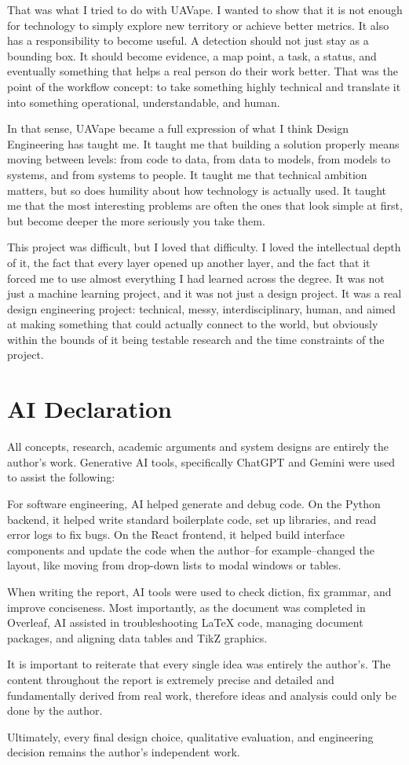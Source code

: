 That was what I tried to do with UAVape. I wanted to show that it is not enough for technology to simply explore new territory or achieve better metrics. It also has a responsibility to become useful. A detection should not just stay as a bounding box. It should become evidence, a map point, a task, a status, and eventually something that helps a real person do their work better. That was the point of the workflow concept: to take something highly technical and translate it into something operational, understandable, and human.

In that sense, UAVape became a full expression of what I think Design Engineering has taught me. It taught me that building a solution properly means moving between levels: from code to data, from data to models, from models to systems, and from systems to people. It taught me that technical ambition matters, but so does humility about how technology is actually used. It taught me that the most interesting problems are often the ones that look simple at first, but become deeper the more seriously you take them.

This project was difficult, but I loved that difficulty. I loved the intellectual depth of it, the fact that every layer opened up another layer, and the fact that it forced me to use almost everything I had learned across the degree. It was not just a machine learning project, and it was not just a design project. It was a real design engineering project: technical, messy, interdisciplinary, human, and aimed at making something that could actually connect to the world, but obviously within the bounds of it being testable research and the time constraints of the project.

\section{AI Declaration}
All concepts, research, academic arguments and system designs are entirely the author's work. Generative AI tools, specifically ChatGPT and Gemini were used to assist the following:

For software engineering, AI helped generate and debug code. On the Python backend, it helped write standard boilerplate code, set up libraries, and read error logs to fix bugs. On the React frontend, it helped build interface components and update the code when the author--for example--changed the layout, like moving from drop-down lists to modal windows or tables.

When writing the report, AI tools were used to check diction, fix grammar, and improve conciseness. Most importantly, as the document was completed in Overleaf, AI assisted in troubleshooting LaTeX code, managing document packages, and aligning data tables and TikZ graphics.

It is important to reiterate that every single idea was entirely the author's. The content throughout the report is extremely precise and detailed and fundamentally derived from real work, therefore ideas and analysis could only be done by the author.

Ultimately, every final design choice, qualitative evaluation, and engineering decision remains the author's independent work.
